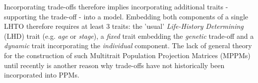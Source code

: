 \documentclass[10pt,a4paper]{article}
\begin{document}
Incorporating trade-offs therefore implies incorporating additional traits - supporting the trade-off - into a model. Embedding both components of a single LHTO therefore requires at least 3 traits: %
the 'usual' \emph{Life-History Determining} (LHD) trait (e.g. \emph{age} or \emph{stage}), a \emph{fixed} trait embedding the \emph{genetic} trade-off and a \emph{dynamic} trait incorporating the \emph{individual} component.
The lack of general theory for the construction of such Multitrait Population Projection Matrices (MPPMs) until recently \citep[see][]{Coste2017,Roth2016} is another reason why trade-offs have not historically been incorporated into PPMs. 
\end{document}
